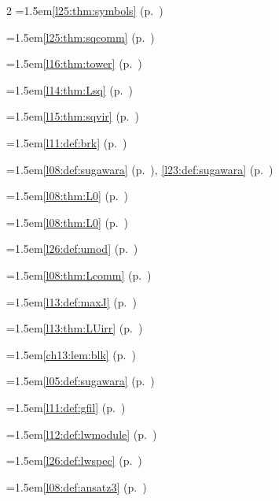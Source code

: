 \begin{multicols}{2}
\hangindent=1.5em\quad \ref{l25:thm:symbols} (p.~\pageref{l25:thm:symbols})\par
\hangindent=1.5em\quad \ref{l25:thm:sqcomm} (p.~\pageref{l25:thm:sqcomm})\par
\hangindent=1.5em\quad \ref{l16:thm:tower} (p.~\pageref{l16:thm:tower})\par
\hangindent=1.5em\quad \ref{l14:thm:Lsq} (p.~\pageref{l14:thm:Lsq})\par
\hangindent=1.5em\quad \ref{l15:thm:sqvir} (p.~\pageref{l15:thm:sqvir})\par
\hangindent=1.5em\quad \ref{l11:def:brk} (p.~\pageref{l11:def:brk})\par
\hangindent=1.5em\quad \ref{l08:def:sugawara} (p.~\pageref{l08:def:sugawara}), \ref{l23:def:sugawara} (p.~\pageref{l23:def:sugawara})\par
\hangindent=1.5em\quad \ref{l08:thm:L0} (p.~\pageref{l08:thm:L0})\par
\hangindent=1.5em\quad \ref{l08:thm:L0} (p.~\pageref{l08:thm:L0})\par
\hangindent=1.5em\quad \ref{l26:def:umod} (p.~\pageref{l26:def:umod})\par
\hangindent=1.5em\quad \ref{l08:thm:Lcomm} (p.~\pageref{l08:thm:Lcomm})\par
\hangindent=1.5em\quad \ref{l13:def:maxJ} (p.~\pageref{l13:def:maxJ})\par
\hangindent=1.5em\quad \ref{l13:thm:LUirr} (p.~\pageref{l13:thm:LUirr})\par
\hangindent=1.5em\quad \ref{ch13:lem:blk} (p.~\pageref{ch13:lem:blk})\par
\hangindent=1.5em\quad \ref{l05:def:sugawara} (p.~\pageref{l05:def:sugawara})\par
\hangindent=1.5em\quad \ref{l11:def:gfil} (p.~\pageref{l11:def:gfil})\par
\hangindent=1.5em\quad \ref{l12:def:lwmodule} (p.~\pageref{l12:def:lwmodule})\par
\hangindent=1.5em\quad \ref{l26:def:lwspec} (p.~\pageref{l26:def:lwspec})\par
\par{}\par\nopagebreak\smallskip
\hangindent=1.5em\quad \ref{l08:def:ansatz3} (p.~\pageref{l08:def:ansatz3})\par

\end{multicols}
